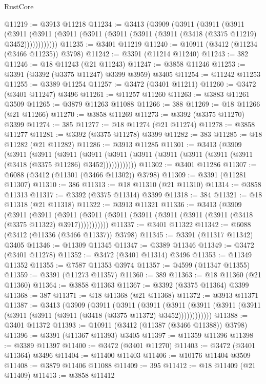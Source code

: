 \begin{lexlean}{RustCore}
\begin{coremodule}
@11219 := @3913 @11218
@11234 := @3413
    (@3909
      (@3911
        (@3911
          (@3911
            (@3911 (@3911 (@3911 (@3911 (@3911 (@3911 (@3911 (@3418 (@3375 @11219) @3452))))))))))))
@11235 := @3401 @11219
@11240 := @10911 (@3412 (@11234 (@3466 @11235)) @3798)
@11242 := @3391 (@11214 @11240)
@11243 := 382
@11246 := @18 @11243 (@21 @11243)
@11247 := @3858 @11246
@11253 := @3391 (@3392 (@3375 @11247) @3399 @3959) @3405
@11254 := @11242 @11253
@11255 := @3389 @11254
@11257 := @3472 (@3401 @11211)
@11260 := @3472 (@3401 @11247) @3496
@11261 := @11257 @11260
@11263 := @3883 @11261 @3509
@11265 := @3879 @11263 @11088
@11266 := 388
@11269 := @18 @11266 (@21 @11266)
@11270 := @3858 @11269
@11273 := @3392 (@3375 @11270) @3399
@11274 := 385
@11277 := @18 @11274 (@21 @11274)
@11278 := @3858 @11277
@11281 := @3392 (@3375 @11278) @3399
@11282 := 383
@11285 := @18 @11282 (@21 @11282)
@11286 := @3913 @11285
@11301 := @3413
    (@3909
      (@3911
        (@3911
          (@3911
            (@3911 (@3911 (@3911 (@3911 (@3911 (@3911 (@3911 (@3418 (@3375 @11286) @3452))))))))))))
@11302 := @3401 @11286
@11307 := @6088 (@3412 (@11301 (@3466 @11302)) @3798)
@11309 := @3391 (@11281 @11307)
@11310 := 386
@11313 := @18 @11310 (@21 @11310)
@11314 := @3858 @11313
@11317 := @3392 (@3375 @11314) @3399
@11318 := 384
@11321 := @18 @11318 (@21 @11318)
@11322 := @3913 @11321
@11336 := @3413
    (@3909
      (@3911
        (@3911
          (@3911 (@3911 (@3911 (@3911 (@3911 (@3911 (@3911 (@3418 (@3375 @11322) @3917)))))))))))
@11337 := @3401 @11322
@11342 := @6088 (@3412 (@11336 (@3466 @11337)) @3798)
@11345 := @3391 (@11317 @11342) @3405
@11346 := @11309 @11345
@11347 := @3389 @11346
@11349 := @3472 (@3401 @11278)
@11352 := @3472 (@3401 @11314) @3496
@11353 := @11349 @11352
@11355 := @7587 @11353 @3974
@11357 := @4599 (@11347 @11355)
@11359 := @3391 (@11273 @11357)
@11360 := 389
@11363 := @18 @11360 (@21 @11360)
@11364 := @3858 @11363
@11367 := @3392 (@3375 @11364) @3399
@11368 := 387
@11371 := @18 @11368 (@21 @11368)
@11372 := @3913 @11371
@11387 := @3413
    (@3909
      (@3911
        (@3911
          (@3911
            (@3911 (@3911 (@3911 (@3911 (@3911 (@3911 (@3911 (@3418 (@3375 @11372) @3452))))))))))))
@11388 := @3401 @11372
@11393 := @10911 (@3412 (@11387 (@3466 @11388)) @3798)
@11396 := @3391 (@11367 @11393) @3405
@11397 := @11359 @11396
@11398 := @3389 @11397
@11400 := @3472 (@3401 @11270)
@11403 := @3472 (@3401 @11364) @3496
@11404 := @11400 @11403
@11406 := @10176 @11404 @3509
@11408 := @3879 @11406 @11088
@11409 := 395
@11412 := @18 @11409 (@21 @11409)
@11413 := @3858 @11412

\end{coremodule}
\end{lexlean}
